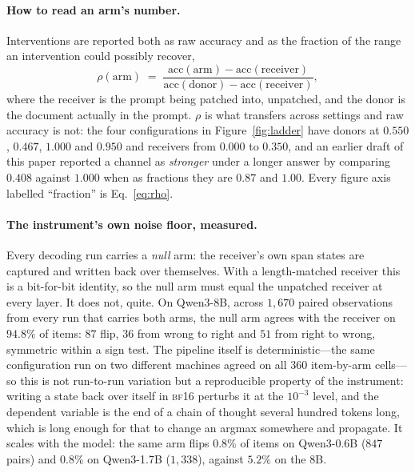 \documentclass{article}
\begin{document}
\paragraph{How to read an arm's number.} Interventions are reported both as raw
accuracy and as the fraction of the range an intervention could possibly
recover,
\begin{equation}
\rho(\text{arm}) \;=\;
\frac{\text{acc}(\text{arm}) - \text{acc}(\text{receiver})}
     {\text{acc}(\text{donor}) - \text{acc}(\text{receiver})},
\end{equation}
where the receiver is the prompt being patched into, unpatched, and the donor is
the document actually in the prompt. $\rho$ is what transfers across settings and
raw accuracy is not: the four configurations in Figure~\ref{fig:ladder} have
donors at $0.550$, $0.467$, $1.000$ and $0.950$ and receivers from $0.000$ to
$0.350$, and an earlier draft of this paper reported a channel as \emph{stronger}
under a longer answer by comparing $0.408$ against $1.000$ when as fractions
they are $0.87$ and $1.00$. Every figure axis labelled ``fraction'' is
Eq.~\ref{eq:rho}.

\paragraph{The instrument's own noise floor, measured.} Every decoding run
carries a \emph{null} arm: the receiver's own span states are captured and
written back over themselves. With a length-matched receiver this is a
bit-for-bit identity, so the null arm must equal the unpatched receiver at every
layer. It does not, quite. On Qwen3-8B, across $1{,}670$ paired observations
from every run that carries both arms, the null arm agrees with the receiver on
$94.8\%$ of items: $87$ flip, $36$ from wrong to right and $51$ from right to
wrong, symmetric within a sign test. The pipeline itself is
deterministic---the same configuration run on two different machines agreed on
all $360$ item-by-arm cells---so this is not run-to-run variation but a
reproducible property of the instrument: writing a state back over itself in
\textsc{bf16} perturbs it at the $10^{-3}$ level, and the dependent variable is
the end of a chain of thought several hundred tokens long, which is long enough
for that to change an argmax somewhere and propagate. It scales with the model:
the same arm flips $0.8\%$ of items on Qwen3-0.6B ($847$ pairs) and $0.8\%$ on
Qwen3-1.7B ($1{,}338$), against $5.2\%$ on the 8B.
\end{document}
